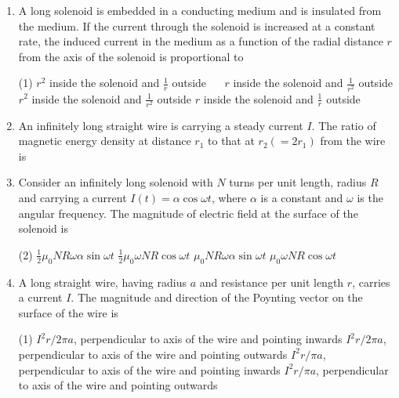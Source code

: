 \begin{enumerate}
	\item A long solenoid is embedded in a conducting medium and is insulated from the medium. If the current through the solenoid is increased at a constant rate, the induced current in the medium as a function of the radial distance $r$ from the axis of the solenoid is proportional to
{}
\begin{tasks}(1)
	\task[\textbf{A.}] $r^{2}$ inside the solenoid and $\frac{1}{r}$ outside $\quad$  
	\task[\textbf{B.}]$r$ inside the solenoid and $\frac{1}{r^{2}}$ outside
	\task[\textbf{C.}] $r^{2}$ inside the solenoid and $\frac{1}{r^{2}}$ outside
	\task[\textbf{D.}]$r$ inside the solenoid and $\frac{1}{r}$ outside
\end{tasks}



	\item An infinitely long straight wire is carrying a steady current $I$. The ratio of magnetic energy density at distance $r_{1}$ to that at $r_{2}\left(=2 r_{1}\right)$ from the wire is
{	}
	\item Consider an infinitely long solenoid with $N$ turns per unit length, radius $R$ and carrying a current $I(t)=\alpha \cos \omega t$, where $\alpha$ is a constant and $\omega$ is the angular frequency. The magnitude of electric field at the surface of the solenoid is
{	}
\begin{tasks}(2)
	\task[\textbf{A.}] $\frac{1}{2} \mu_{0} N R \omega \alpha \sin \omega t$
	\task[\textbf{B.}]$\frac{1}{2} \mu_{0} \omega N R \cos \omega t$
	\task[\textbf{C.}]$\mu_{0} N R \omega \alpha \sin \omega t$
	\task[\textbf{D.}]$\mu_{0} \omega N R \cos \omega t$
\end{tasks}

	\item A long straight wire, having radius $a$ and resistance per unit length $r$, carries a current $I$. The magnitude and direction of the Poynting vector on the surface of the wire is
	{}

\begin{tasks}(1)
	\task[\textbf{A.}] $I^{2} r / 2 \pi a$, perpendicular to axis of the wire and pointing inwards
	\task[\textbf{B.}]$I^{2} r / 2 \pi a$, perpendicular to axis of the wire and pointing outwards
	\task[\textbf{C.}]$I^{2} r / \pi a$, perpendicular to axis of the wire and pointing inwards
	\task[\textbf{D.}]$I^{2} r / \pi a$, perpendicular to axis of the wire and pointing outwards
\end{tasks}







\end{enumerate}






























